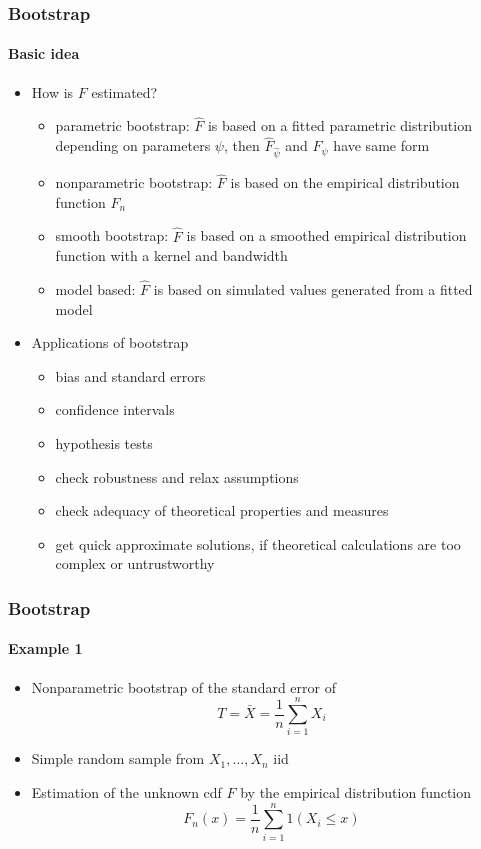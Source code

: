 \documentclass[smaller,compress]{beamer}
\begin{document}
\begin{frame}\frametitle{Bootstrap}\framesubtitle{Basic idea}
\begin{itemize}
    \item How is $F$ estimated?
    \begin{itemize}
    \item parametric bootstrap: $\hat{F}$ is based on a fitted parametric distribution depending on parameters $\psi$, then $\hat{F}_{\hat{\psi}}$ and $F_\psi$ have same form
    \item nonparametric bootstrap: $\hat{F}$ is based on the empirical distribution function $F_n$
    \item smooth bootstrap: $\hat{F}$ is based on a smoothed empirical distribution function with a kernel and bandwidth
    \item model based: $\hat{F}$ is based on simulated values generated from a fitted model
    \end{itemize}
    \item Applications of bootstrap
    \begin{itemize}
    \item bias and standard errors
    \item confidence intervals
    \item hypothesis tests
    \item check robustness and relax assumptions
    \item check adequacy of theoretical properties and measures
    \item get quick approximate solutions, if theoretical calculations are too complex or untrustworthy
    \end{itemize}
\end{itemize}
\end{frame}


\begin{frame}\frametitle{Bootstrap}\framesubtitle{Example 1}
\begin{itemize}
    \item Nonparametric bootstrap of the standard error of
    \begin{equation*}
    T=\bar{X}=\frac{1}{n}\sum_{i=1}^{n}X_{i}
    \end{equation*}
    \item Simple random sample from $X_{1},\ldots ,X_{n}$ iid

    \item Estimation of the unknown cdf $F$ by the empirical distribution function
    \begin{equation*}
    F_{n}(x)=\frac{1}{n}\sum_{i=1}^{n}1\left( X_{i}\leq x\right)
    \end{equation*}
\end{itemize}
\end{frame}
\end{document}
